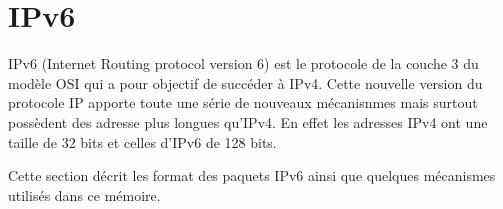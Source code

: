 
\section{IPv6}\label{sec:state-ipv6}
\renewcommand{\rightmark}{IPv6}

IPv6 (Internet Routing protocol version 6) est le protocole de la couche 3 du modèle OSI qui a pour objectif de succéder à IPv4. Cette nouvelle version du protocole IP apporte toute une série de nouveaux mécanisnmes mais surtout possèdent des adresse plus longues qu'IPv4. En effet les adresses IPv4 ont une taille de 32 bits et celles d'IPv6 de 128 bits.

Cette section décrit les format des paquets IPv6 ainsi que quelques mécanismes utilisés dans ce mémoire.